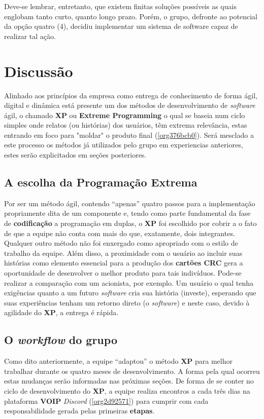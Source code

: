 \documentclass[11pt, a4paper]{article}
\begin{document}
Deve-se lembrar, entretanto, que existem finitas soluções possíveis as quais
englobam tanto curto, quanto longo prazo. Porém, o grupo, defronte ao
potencial da opção quatro (4), decidiu implementar um sistema de software
capaz de realizar tal ação. 

\section{Discussão}
\label{sec:org4c57f53}
Alinhado aos princípios da empresa como entrega de conhecimento de forma
ágil, digital e dinâmica está presente um dos métodos 
de desenvolvimento de \emph{software} ágil, o chamado \textbf{XP} ou \textbf{Extreme Programming}
o qual se baseia num ciclo simples onde relatos (ou histórias) dos usuários,
têm extrema relevância, estas
entrando em foco para "moldar" o produto final (\ref{org376bcb0}). Será mesclado
a este processo os métodos já utilizados pelo grupo em experiencias anteriores,
estes serão explicitados em seções posteriores.

\subsection{A escolha da Programação Extrema}
\label{sec:org7a53bc8}
Por ser um método ágil, contendo ``apenas'' quatro passos para a implementação
propriamente dita de um componente e, tendo como parte fundamental da fase de
\textbf{codificação} a programação em duplas, o \textbf{XP} foi escolhido por cobrir a
o fato de que a equipe não conta com mais do que, exatamente, dois integrantes.
Qualquer
outro método não foi enxergado como apropriado com o estilo de trabalho da
equipe. Além disso, a proximidade com o usuário ao incluir suas histórias como
elemento essencial para a produção dos \textbf{cartões CRC} gera a oportunidade de
desenvolver o melhor produto para tais indivíduos. Pode-se realizar a comparação
com um acionista, por exemplo. Um usuário o qual tenha exigências
quanto a um futuro \emph{software} cria sua história (investe), esperando que
suas experiências tenham um retorno direto (o \emph{software}) e neste caso,
devido à agilidade do \textbf{XP}, a entrega é rápida.

\subsection{O \emph{workflow} do grupo}
\label{sec:orgbb00d6a}
Como dito anteriormente, a equipe ``adaptou'' o método \textbf{XP} para melhor trabalhar
durante os quatro meses de desenvolvimento. A forma pela qual ocorreu estas
mudanças serão informadas nas próximas seções. De forma de se conter no ciclo
de desenvolvimento do \textbf{XP}, a equipe realiza encontros a cada três dias na
plataforma \textbf{VOIP} \emph{Discord} (\ref{org2d92571}) para cumprir com cada responsabilidade gerada
pelas primeiras \textbf{etapas}.
\end{document}
